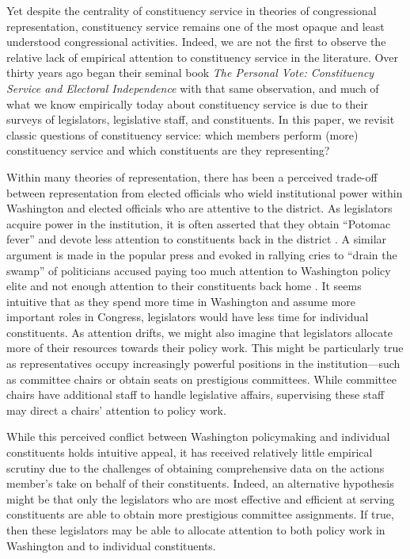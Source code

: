 \documentclass{article}
\begin{document}
Yet despite the centrality of constituency service in theories of congressional representation, constituency service remains one of the most opaque and least understood congressional activities. Indeed, we are not the first to observe the relative lack of empirical attention to constituency service in the literature.  Over thirty years ago \citet*{CainFerejohnFiorina1987} began their seminal book \emph{The Personal Vote: Constituency Service and Electoral Independence} with that same observation, and much of what we know empirically today about constituency service is due to their surveys of legislators, legislative staff, and constituents.  In this paper, we revisit classic questions of constituency service: which members perform (more) constituency service and which constituents are they representing?  

Within many theories of representation, there has been a perceived trade-off between representation from elected officials who wield institutional power within Washington and elected officials who are attentive to the district.  As legislators acquire power in the institution, it is often asserted that they obtain ``Potomac fever'' and devote less attention to constituents back in the district \citep{Fenno1978}.  A similar argument is made in the popular press \citep{Edwards2005} and evoked in rallying cries to ``drain the swamp'' of politicians accused paying too much attention to Washington policy elite and not enough attention to their constituents back home \citep{Rosenblatt2016}.  It seems intuitive that as they spend more time in Washington and assume more important roles in Congress, legislators would have less time for individual constituents.  As attention drifts, we might also imagine that legislators allocate more of their resources towards their policy work.  This might be particularly true as representatives occupy increasingly powerful positions in the institution---such as committee chairs or obtain seats on prestigious committees. While committee chairs have additional staff to handle legislative affairs, supervising these staff may direct a chairs' attention to policy work. 

While this perceived conflict between Washington policymaking and individual constituents holds intuitive appeal, it has received relatively little empirical scrutiny due to the challenges of obtaining comprehensive data on the actions member's take on behalf of their constituents.  Indeed, an alternative hypothesis might be that only the legislators who are most effective and efficient at serving constituents are able to obtain more prestigious committee assignments.  If true, then these legislators may be able to allocate attention to both policy work in Washington and to individual constituents. 
\end{document}
